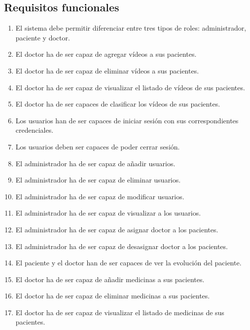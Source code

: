 \subsection{Requisitos funcionales}
\begin{enumerate}[label=\textbf{RF\arabic*:}]

\item El sistema debe permitir diferenciar entre tres tipos de roles: administrador, paciente y doctor.
\item El doctor ha de ser capaz de agregar vídeos a sus pacientes.
\item El doctor ha de ser capaz de eliminar vídeos a sus pacientes.
\item El doctor ha de ser capaz de visualizar el listado de vídeos de sus pacientes.
\item El doctor ha de ser capaces de clasificar los vídeos de sus pacientes.
\item Los usuarios han de ser capaces de iniciar sesión con sus correspondientes credenciales.
\item Los usuarios deben ser capaces de poder cerrar sesión.
\item El administrador ha de ser capaz de añadir usuarios.
\item El administrador ha de ser capaz de eliminar usuarios.
\item El administrador ha de ser capaz de modificar usuarios.
\item El administrador ha de ser capaz de visualizar a los usuarios.
\item El administrador ha de ser capaz de asignar doctor a los pacientes.
\item El administrador ha de ser capaz de desasignar doctor a los pacientes.
\item El paciente y el doctor han de ser capaces de ver la evolución del paciente.
\item El doctor ha de ser capaz de añadir medicinas a sus pacientes.
\item El doctor ha de ser capaz de eliminar medicinas a sus pacientes.
\item El doctor ha de ser capaz de visualizar el listado de medicinas de sus pacientes.

\end{enumerate}
